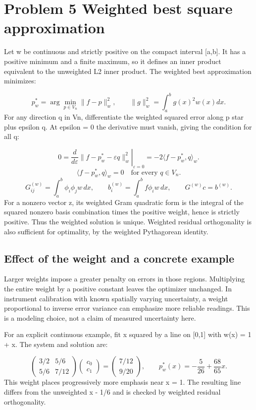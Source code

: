 \documentclass[a4paper,11pt]{article}
\begin{document}
\clearpage
\section*{Problem 5 Weighted best square approximation}
Let w be continuous and strictly positive on the compact interval [a,b]. It has a positive minimum and a finite maximum, so it defines an inner product equivalent to the unweighted L2 inner product. The weighted best approximation minimizes:

\[p_w^*=\arg\min_{p\in V_n}\|f-p\|_w^2,\qquad \|g\|_w^2=\int_a^bg(x)^2w(x)dx.\]
For any direction q in Vn, differentiate the weighted squared error along p star plus epsilon q. At epsilon = 0 the derivative must vanish, giving the condition for all q:

\[0=\left.\frac{d}{d\varepsilon}\|f-p_w^*-\varepsilon q\|_w^2\right|_{\varepsilon=0}=-2\langle f-p_w^*,q\rangle_w.\]
\[\langle f-p_w^*,q\rangle_w=0\quad\text{for every }q\in V_n.\]
\[G^{(w)}_{ij}=\int_a^b\phi_i\phi_jw\,dx,\qquad b^{(w)}_i=\int_a^bf\phi_iw\,dx,\qquad G^{(w)}c=b^{(w)}.\]
For a nonzero vector z, its weighted Gram quadratic form is the integral of the squared nonzero basis combination times the positive weight, hence is strictly positive. Thus the weighted solution is unique. Weighted residual orthogonality is also sufficient for optimality, by the weighted Pythagorean identity.

\subsection*{Effect of the weight and a concrete example}
Larger weights impose a greater penalty on errors in those regions. Multiplying the entire weight by a positive constant leaves the optimizer unchanged. In instrument calibration with known spatially varying uncertainty, a weight proportional to inverse error variance can emphasize more reliable readings. This is a modeling choice, not a claim of measured uncertainty here.

For an explicit continuous example, fit x squared by a line on [0,1] with w(x) = 1 + x. The system and solution are:

\[\begin{pmatrix}3/2&5/6\\5/6&7/12\end{pmatrix}\begin{pmatrix}c_0\\c_1\end{pmatrix}=\begin{pmatrix}7/12\\9/20\end{pmatrix},\qquad p_w^*(x)=-\frac5{26}+\frac{68}{65}x.\]
This weight places progressively more emphasis near x = 1. The resulting line differs from the unweighted x - 1/6 and is checked by weighted residual orthogonality.
\end{document}
